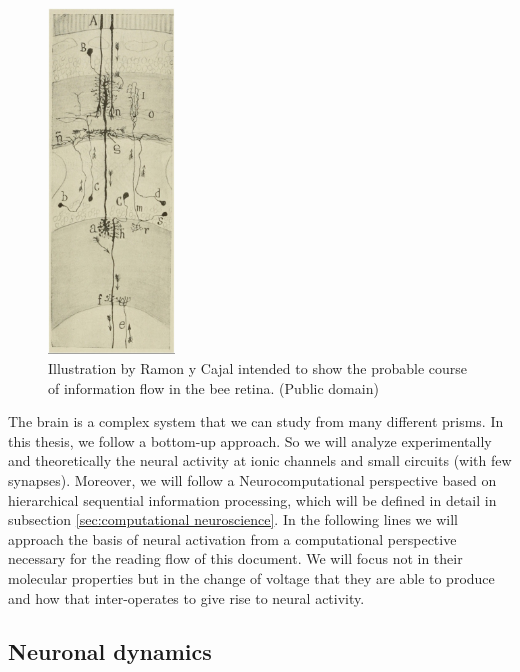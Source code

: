 \begin{figure}[htb!]
    \centering
    \includegraphics[width=0.3\textwidth]{img/intro/cajal-flow_small.jpg}
    \caption{Illustration by Ramon y Cajal intended to show the probable course of information flow in the bee retina. \parencite{ramonycajal_sobre_1915} (Public domain)}
    \label{cajal-neuron}
\end{figure}


The brain is a complex system that we can study from many different prisms. In this thesis, we follow a bottom-up approach. So we will analyze experimentally and theoretically the neural activity at ionic channels and small circuits (with few synapses). Moreover, we will follow a Neurocomputational perspective based on hierarchical sequential information processing, which will be defined in detail in subsection \ref{sec:computational neuroscience}. In the following lines we will approach the basis of neural activation from a computational perspective necessary for the reading flow of this document. We will focus not in their molecular properties but in the change of voltage that they are able to produce and how that inter-operates to give rise to neural activity. 

\subsection{Neuronal dynamics}

